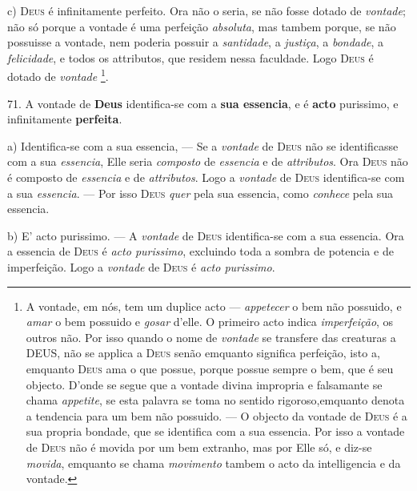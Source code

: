 c) \textsc{Deus} é infinitamente perfeito. Ora não o seria, se não fosse dotado de \emph{vontade}; não só porque a vontade é uma perfeição \emph{absoluta}, mas tambem porque, se não possuisse a vontade, nem poderia possuir a \emph{santidade}, a \emph{justiça}, a \emph{bondade}, a \emph{felicidade}, e todos os attributos, que residem nessa faculdade. Logo \textsc{Deus} é dotado de \emph{vontade} \footnote{A vontade, em nós, tem um duplice acto --- \emph{appetecer} o bem não possuido, e \emph{amar} o bem possuido e \emph{gosar} d'elle. O primeiro acto indica \emph{imperfeição}, os outros não. Por isso quando o nome de \emph{vontade} se transfere das creaturas a \textsc{DEUS}, não se applica a \textsc{Deus} senão emquanto significa perfeição, isto a, emquanto \textsc{Deus} ama o que possue, porque possue sempre o bem, que é seu objecto. D'onde se segue que a vontade divina impropria e falsamante se chama \emph{appetite}, se esta palavra se toma no sentido rigoroso,emquanto denota a tendencia para um bem não possuido. --- O objecto da vontade de \textsc{Deus} é a sua propria bondade, que se identifica com a sua essencia. Por isso a vontade de \textsc{Deus} não é movida por um bem extranho, mas por Elle só, e diz-se \emph{movida}, emquanto se chama \emph{movimento} tambem o acto da intelligencia e da vontade.}.

 71. A vontade de \textbf{Deus} identifica-se com a \textbf{sua essencia}, e é \textbf{acto} purissimo, e infinitamente \textbf{perfeita}.

a) Identifica-se com a sua essencia, --- Se a \emph{vontade} de \textsc{Deus} não se identificasse com a sua \emph{essencia}, Elle seria \emph{composto} de \emph{essencia} e de \emph{attributos}. Ora \textsc{Deus} não é composto de \emph{essencia} e de \emph{attributos}. Logo a \emph{vontade} de \textsc{Deus} identifica-se com a sua \emph{essencia}. --- Por isso \textsc{Deus} \emph{quer} pela sua essencia, como \emph{conhece} pela sua essencia.

b) E' acto purissimo. --- A \emph{vontade} de \textsc{Deus} identifica-se com a sua essencia. Ora a essencia de \textsc{Deus} é \emph{acto purissimo}, excluindo toda a sombra de potencia e de imperfeição. Logo a \emph{vontade} de \textsc{Deus} é \emph{acto purissimo}.

